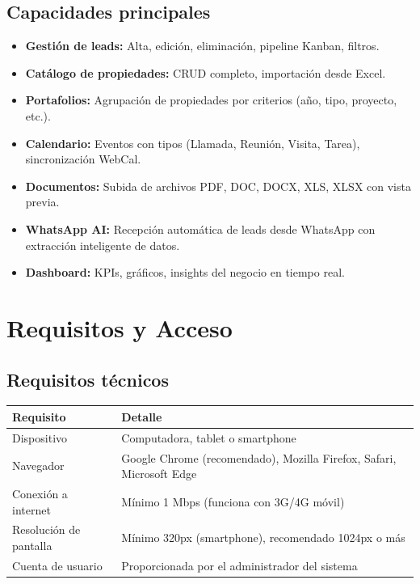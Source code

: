 \documentclass[12pt,oneside]{article}
\begin{document}
\subsection{Capacidades principales}

\begin{itemize}[leftmargin=*]
  \item \textbf{Gestión de leads:} Alta, edición, eliminación, pipeline Kanban, filtros.
  \item \textbf{Catálogo de propiedades:} CRUD completo, importación desde Excel.
  \item \textbf{Portafolios:} Agrupación de propiedades por criterios (año, tipo, proyecto, etc.).
  \item \textbf{Calendario:} Eventos con tipos (Llamada, Reunión, Visita, Tarea), sincronización WebCal.
  \item \textbf{Documentos:} Subida de archivos PDF, DOC, DOCX, XLS, XLSX con vista previa.
  \item \textbf{WhatsApp AI:} Recepción automática de leads desde WhatsApp con extracción inteligente de datos.
  \item \textbf{Dashboard:} KPIs, gráficos, insights del negocio en tiempo real.
\end{itemize}

\section{Requisitos y Acceso}

\subsection{Requisitos técnicos}

\begin{tabularx}{\textwidth}{|X|X|}
\hline
\rowcolor{primary!10}
\textbf{Requisito} & \textbf{Detalle} \\
\hline
Dispositivo & Computadora, tablet o smartphone \\
\hline
Navegador & Google Chrome (recomendado), Mozilla Firefox, Safari, Microsoft Edge \\
\hline
Conexión a internet & Mínimo 1 Mbps (funciona con 3G/4G móvil) \\
\hline
Resolución de pantalla & Mínimo 320px (smartphone), recomendado 1024px o más \\
\hline
Cuenta de usuario & Proporcionada por el administrador del sistema \\
\hline
\end{tabularx}
\end{document}
